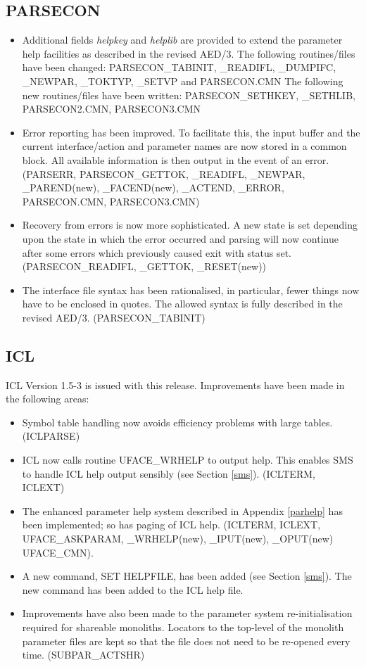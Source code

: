 \subsection{PARSECON}
\label{parse}
\begin{itemize}
\item Additional fields {\em helpkey} and {\em helplib} are provided to
extend the parameter help facilities as described in the revised AED/3.
The following routines/files have been changed: PARSE\-CON\-\_TAB\-INIT,
\_READ\-IFL,
\_DUMP\-IFC, \_NEW\-PAR, \_TOK\-TYP, \_SET\-VP and PARSE\-CON\-.CMN
The following new routines/files have been written: PARSE\-CON\-\_SET\-HKEY, 
\_SET\-HLIB, PARSE\-CON2\-.CMN, PARSE\-CON3\-.CMN
\item Error reporting has been improved. To facilitate this, the input
buffer and the current interface/action and parameter names are now stored in a 
common block. All available information is then output in the event of an
error.
(PARSERR, PARSE\-CON\-\_GET\-TOK, \_READ\-IFL, \_NEW\-PAR, \_PAR\-END(new),
\_FAC\-END(new), \_ACT\-END,
\_ERROR, PARSE\-CON\-.CMN, PARSE\-CON3\-.CMN)
\item Recovery from errors is now more sophisticated. 
A new state is set depending upon the state in which the error occurred and
parsing will now continue after some errors which previously caused exit with 
status set.
(PARSE\-CON\-\_READ\-IFL, \_GET\-TOK, \_RE\-SET(new))
\item The interface file syntax has been rationalised, in particular, fewer 
things now have to be enclosed in quotes. The allowed syntax is fully described
in the revised AED/3\@. (PARSECON\_TABINIT)
\end{itemize}

\subsection{ICL}
\label{icl}
ICL Version 1.5-3 is issued with this release.
Improvements have been made in the following areas:
\begin{itemize}
\item Symbol table handling now avoids efficiency problems with large
tables. (ICLPARSE)
\item ICL now calls routine UFACE\_WRHELP to output help. This enables SMS
to handle ICL help output sensibly (see Section \ref{sms})\@. (ICLTERM, ICLEXT)
\item The enhanced parameter help system described in Appendix \ref{parhelp}
has been implemented; so has paging of ICL help.
(ICL\-TERM, ICL\-EXT, UFACE\_\-ASK\-PARAM, \_WRHELP\-(new), \_IPUT\-(new), 
\_OPUT\-(new) UFACE\_\-CMN).
\item A new command, SET HELPFILE, has been added (see Section \ref{sms})\@.
The new command has been added to the ICL help file.
\item Improvements have also been made to the parameter system re-initialisation
required for shareable monoliths. Locators to the top-level of the
monolith parameter files are kept so that the file does not need to be
re-opened every time. (SUBPAR\_ACTSHR)
\end{itemize}

